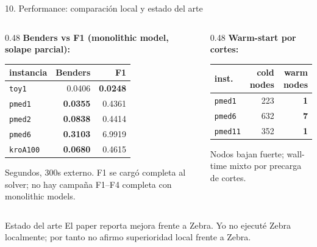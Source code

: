 \documentclass[10pt,aspectratio=169]{beamer}
\begin{document}
\begin{frame}{10. Performance: comparación local y estado del arte}
\begin{columns}
\begin{column}{0.48\textwidth}
\textbf{Benders vs F1 (monolithic model, solape parcial):}
\begin{center}\scriptsize
\begin{tabular}{lrr}
\toprule
instancia & Benders & F1 \\
\midrule
\texttt{toy1} & 0.0406 & \textbf{0.0248} \\
\texttt{pmed1} & \textbf{0.0355} & 0.4361 \\
\texttt{pmed2} & \textbf{0.0838} & 0.4414 \\
\texttt{pmed6} & \textbf{0.3103} & 6.9919 \\
\texttt{kroA100} & \textbf{0.0680} & 0.4615 \\
\bottomrule
\end{tabular}
\end{center}
\footnotesize Segundos, 300s externo. F1 se cargó completa al solver; no hay campaña F1--F4 completa con monolithic models.
\end{column}
\begin{column}{0.48\textwidth}
\textbf{Warm-start por cortes:}
\begin{center}\scriptsize
\begin{tabular}{lrr}
\toprule
inst. & cold nodes & warm nodes \\
\midrule
\texttt{pmed1} & 223 & \textbf{1} \\
\texttt{pmed6} & 632 & \textbf{7} \\
\texttt{pmed11} & 352 & \textbf{1} \\
\bottomrule
\end{tabular}
\end{center}
\footnotesize Nodos bajan fuerte; wall-time mixto por precarga de cortes.
\end{column}
\end{columns}
\vfill
\begin{alertblock}{Estado del arte}
El paper reporta mejora frente a Zebra. Yo no ejecuté Zebra localmente; por tanto no afirmo superioridad local frente a Zebra.
\end{alertblock}
\end{frame}
\end{document}
